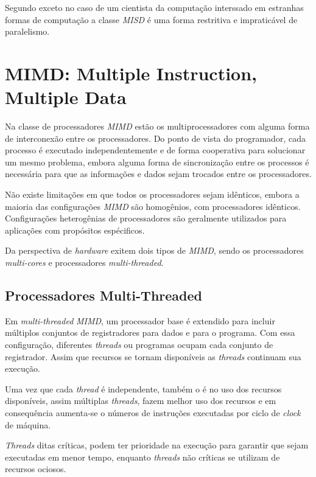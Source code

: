 Segundo \cite{Openshaw:1999} exceto no caso de um cientista da computação
interssado em estranhas formas de computação a classe \textit{MISD} é uma forma
restritiva e impraticável de paralelismo.

\section{MIMD: Multiple Instruction, Multiple Data}

Na classe de processadores \textit{MIMD} estão os multiprocessadores
com alguma forma de interconexão entre os processadores. Do ponto de vista do
programador, cada processo é executado independentemente e de forma cooperativa
para solucionar um mesmo problema, embora alguma forma de sincronização entre os
processos é necessária para que as informações e dados sejam trocados entre os
processadores.

Não existe limitações em que todos os processadores sejam idênticos, embora a
maioria das configurações \textit{MIMD} são homogênios, com processadores
idênticos. Configurações heterogênias de processadores são geralmente utilizados
para aplicações com propósitos espécificos.

Da perspectiva de \textit{hardware} exitem dois tipos de \textit{MIMD}, sendo os
processadores \textit{multi-cores} e processadores \textit{multi-threaded}.


\subsection{Processadores Multi-Threaded}

Em \textit{multi-threaded} \textit{MIMD}, um processador base é
extendido para incluir múltiplos conjuntos de registradores para dados e para o
programa.
Com essa configuração, diferentes \textit{threads} ou programas ocupam cada
conjunto de registrador. Assim que recursos se tornam disponíveis as
\textit{threads} continuam sua execução.

Uma vez que cada \textit{thread} é independente, também o é no uso dos recursos
disponíveis, assim múltiplas \textit{threads}, fazem melhor uso dos recursos e
em consequência aumenta-se o números de instruções executadas por ciclo de
\textit{clock} de máquina.

\textit{Threads} ditas críticas, podem ter prioridade na execução para garantir
que sejam executadas em menor tempo, enquanto \textit{threads} não críticas se
utilizam de recursos ociosos.


